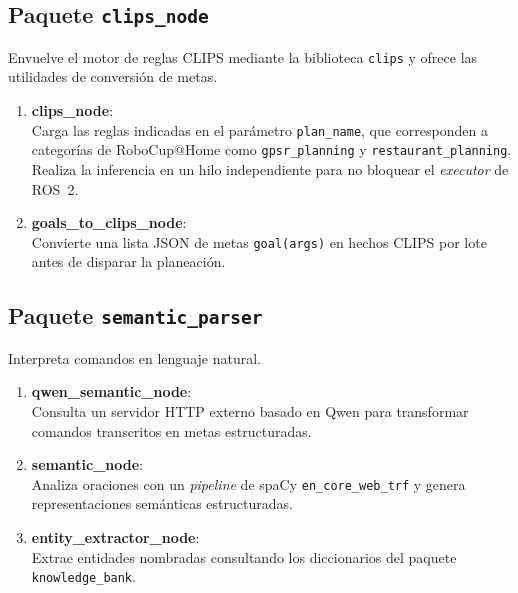 
\subsection{Paquete \texttt{clips\_node}}
Envuelve el motor de reglas CLIPS mediante la biblioteca \texttt{clips} y ofrece las utilidades de conversión de metas.

\begin{enumerate}
    \item \textbf{clips\_node}: \\
    Carga las reglas indicadas en el parámetro \texttt{plan\_name}, que corresponden a categorías de RoboCup@Home como \texttt{gpsr\_planning} y \texttt{restaurant\_planning}. Realiza la inferencia en un hilo independiente para no bloquear el \textit{executor} de ROS~2.

    \item \textbf{goals\_to\_clips\_node}: \\
    Convierte una lista JSON de metas \texttt{goal(args)} en hechos CLIPS por lote antes de disparar la planeación.
\end{enumerate}


\subsection{Paquete \texttt{semantic\_parser}}
Interpreta comandos en lenguaje natural.

\begin{enumerate}
    \item \textbf{qwen\_semantic\_node}: \\
    Consulta un servidor HTTP externo basado en Qwen para transformar comandos transcritos en metas estructuradas.

    \item \textbf{semantic\_node}: \\
    Analiza oraciones con un \textit{pipeline} de spaCy \texttt{en\_core\_web\_trf} y genera representaciones semánticas estructuradas.

    \item \textbf{entity\_extractor\_node}: \\
    Extrae entidades nombradas consultando los diccionarios del paquete \texttt{knowledge\_\allowbreak{}bank}.
\end{enumerate}

